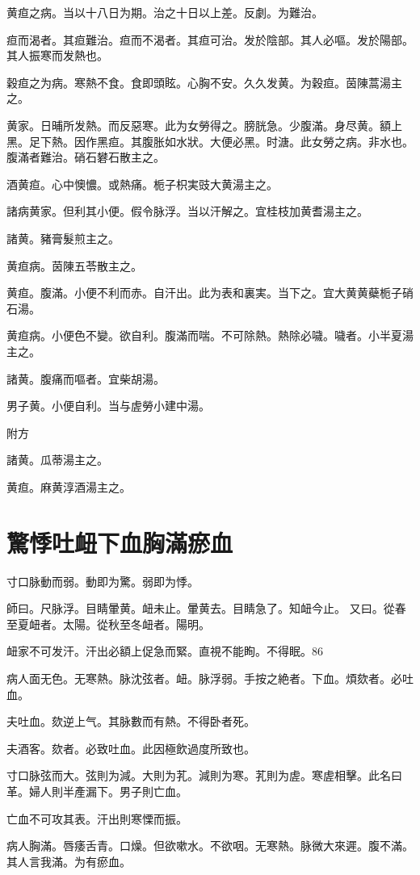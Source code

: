 \documentclass[b5paper,twoside,zihao=-4,UTF8]{ctexbook}
\begin{document}
黄疸之病。当以十八日为期。治之十日以上差。反劇。为難治。

疸而渴者。其疸難治。疸而不渴者。其疸可治。发於陰部。其人必嘔。{发於}陽部。其人振寒而发熱也。

穀疸之为病。寒熱不食。食即頭眩。心胸不安。久久发黄。为穀疸。茵陳蒿湯主之。

黄家。日晡所发熱。而反惡寒。此为女勞得之。膀胱急。少腹滿。身尽黄。額上黑。足下熱。因作黑疸。其腹胀如水狀。大便必黑。时溏。此女勞之病。非水也。腹滿者難治。硝石礬石散主之。

酒黄疸。心中懊憹。或熱痛。栀子{枳実豉}大黄湯主之。

諸病黄家。但利其小便。假令脉浮。当以汗解之。宜桂枝加黄耆湯主之。

諸黄。豬膏髮煎主之。

黄疸病。茵陳五苓散主之。

黄疸。腹滿。小便不利而赤。自汗出。此为表和裏実。当下之。宜大黄{黄蘗栀子}硝石湯。

黄疸病。小便色不變。欲自利。腹滿而喘。不可除熱。熱除必噦。噦者。小半夏湯主之。

諸黄。腹痛而嘔者。宜柴胡湯。

男子黄。小便自利。当与虗勞小建中湯。

附方

諸黄。瓜蒂湯主之。

黄疸。麻黄淳酒湯主之。

\chapter{驚悸吐衄下血胸滿瘀血}

寸口脉動而弱。動即为驚。弱即为悸。

師曰。尺脉浮。目睛暈黄。衄未止。暈黄去。目睛急了。知衄今止。
又曰。從春至夏衄者。太陽。從秋至冬衄者。陽明。

衄家不可发汗。汗出必額上促急{而緊}。直視不能眴。不得眠。86

病人面无色。无寒熱。脉沈弦者。衄。{脉}浮弱。手按之絶者。下血。煩欬者。必吐血。

夫吐血。欬逆上气。其脉數而有熱。不得卧者死。

夫酒客。欬者。必致吐血。此因極飲過度所致也。

寸口脉弦而大。弦則为減。大則为芤。減則为寒。芤則为虗。寒虗相擊。此名曰革。婦人則半產漏下。男子則亡血。

亡血不可攻其表。汗出則寒慄而振。

病人胸滿。唇痿舌青。口燥。但欲嗽水。不欲咽。无寒熱。脉微大來遲。腹不滿。其人言我滿。为有瘀血。
\end{document}
